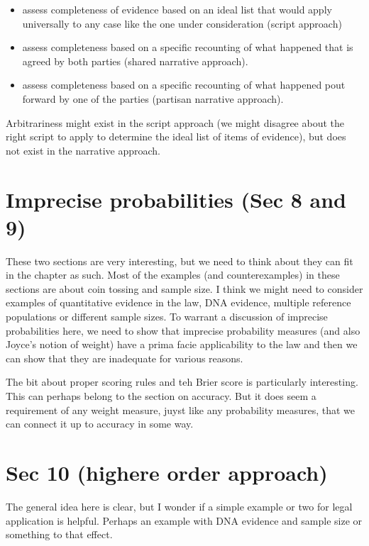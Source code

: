 \documentclass[
  10pt,
  dvipsnames,enabledeprecatedfontcommands]{scrartcl}
\begin{document}
\begin{itemize}
\item
  assess completeness of evidence based on an ideal list that would
  apply universally to any case like the one under consideration (script
  approach)
\item
  assess completeness based on a specific recounting of what happened
  that is agreed by both parties (shared narrative approach).
\item
  assess completeness based on a specific recounting of what happened
  pout forward by one of the parties (partisan narrative approach).
\end{itemize}

Arbitrariness might exist in the script approach (we might disagree
about the right script to apply to determine the ideal list of items of
evidence), but does not exist in the narrative approach.

\hypertarget{imprecise-probabilities-sec-8-and-9}{%
\section{Imprecise probabilities (Sec 8 and
9)}\label{imprecise-probabilities-sec-8-and-9}}

These two sections are very interesting, but we need to think about they
can fit in the chapter as such. Most of the examples (and
counterexamples) in these sections are about coin tossing and sample
size. I think we might need to consider examples of quantitative
evidence in the law, DNA evidence, multiple reference populations or
different sample sizes. To warrant a discussion of imprecise
probabilities here, we need to show that imprecise probability measures
(and also Joyce's notion of weight) have a prima facie applicability to
the law and then we can show that they are inadequate for various
reasons.

The bit about proper scoring rules and teh Brier score is particularly
interesting. This can perhaps belong to the section on accuracy. But it
does seem a requirement of any weight measure, juyst like any
probability measures, that we can connect it up to accuracy in some way.

\hypertarget{sec-10-highere-order-approach}{%
\section{Sec 10 (highere order
approach)}\label{sec-10-highere-order-approach}}

The general idea here is clear, but I wonder if a simple example or two
for legal application is helpful. Perhaps an example with DNA evidence
and sample size or something to that effect.
\end{document}
